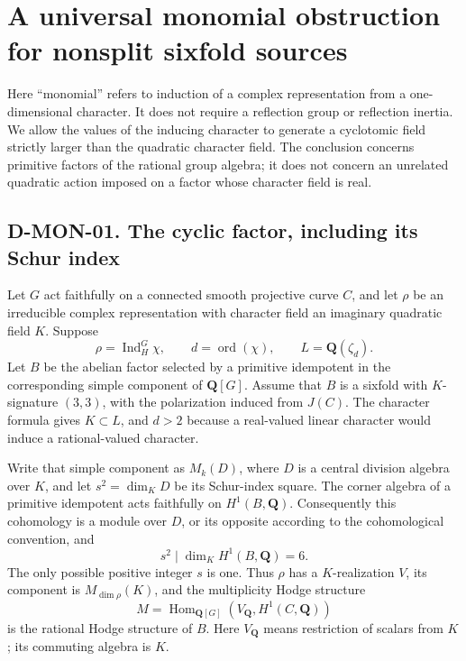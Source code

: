 \section{A universal monomial obstruction for nonsplit sixfold sources}
\label{sec:monomial-sixfold}

Here ``monomial'' refers to induction of a complex representation from a
one-dimensional character. It does not require a reflection group or
reflection inertia. We allow the values of the inducing character to
generate a cyclotomic field strictly larger than the quadratic character
field. The conclusion concerns primitive factors of the rational group
algebra; it does not concern an unrelated quadratic action imposed on a
factor whose character field is real.

\subsection*{D-MON-01. The cyclic factor, including its Schur index}

Let $G$ act faithfully on a connected smooth projective curve $C$, and let
$\rho$ be an irreducible complex representation with character field an
imaginary quadratic field $K$. Suppose
\[
             \rho=\operatorname{Ind}_H^G\chi,
             \qquad d=\operatorname{ord}(\chi),
             \qquad L=\mathbf Q(\zeta_d).
\]
Let $B$ be the abelian factor selected by a primitive idempotent in the
corresponding simple component of $\mathbf Q[G]$. Assume that $B$ is a
sixfold with $K$-signature $(3,3)$, with the polarization induced from
$J(C)$. The character formula gives $K\subset L$, and $d>2$ because a
real-valued linear character would induce a rational-valued character.

Write that simple component as $M_k(D)$, where $D$ is a central division
algebra over $K$, and let $s^2=\dim_KD$ be its Schur-index square. The
corner algebra of a primitive idempotent acts faithfully on $H^1(B,\mathbf Q)$.
Consequently this cohomology is a module over $D$, or its opposite according
to the cohomological convention, and
\[
                     s^2\mid\dim_KH^1(B,\mathbf Q)=6.
\]
The only possible positive integer $s$ is one. Thus $\rho$ has a
$K$-realization $V$, its component is $M_{\dim\rho}(K)$, and the
multiplicity Hodge structure
\[
     M=\operatorname{Hom}_{\mathbf Q[G]}(V_{\mathbf Q},H^1(C,\mathbf Q))
\]
is the rational Hodge structure of $B$. Here $V_{\mathbf Q}$ means
restriction of scalars from $K$; its commuting algebra is $K$.

